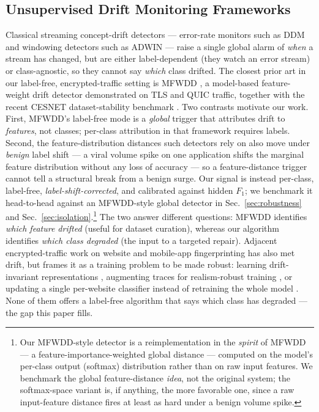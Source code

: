 \subsection{Unsupervised Drift Monitoring Frameworks}
Classical streaming concept-drift detectors --- error-rate monitors such as DDM
\cite{gama2004ddm} and windowing detectors such as ADWIN \cite{bifet2007adwin} ---
raise a single global alarm of \emph{when} a stream has changed, but are either
label-dependent (they watch an error stream) or class-agnostic, so they cannot say
\emph{which} class drifted. The closest prior art in our label-free, encrypted-traffic
setting is MFWDD \cite{mfwdd2024}, a model-based feature-weight
drift detector demonstrated on TLS and QUIC traffic, together with the recent
CESNET dataset-stability benchmark \cite{cesnetdrift2025}. Two contrasts
motivate our work. First, MFWDD's label-free mode is a \emph{global} trigger
that attributes drift to \emph{features}, not classes; per-class attribution in
that framework requires labels. Second, the feature-distribution distances such
detectors rely on also move under \emph{benign} label shift --- a viral volume
spike on one application shifts the marginal feature distribution without any
loss of accuracy --- so a feature-distance trigger cannot tell a structural break
from a benign surge. Our signal is instead per-class, label-free,
\emph{label-shift-corrected}, and calibrated against hidden $F_1$; we benchmark
it head-to-head against an MFWDD-style global detector in
Sec.~\ref{sec:robustness} and Sec.~\ref{sec:isolation}.\footnote{Our MFWDD-style
detector is a reimplementation in the \emph{spirit} of MFWDD --- a
feature-importance-weighted global distance --- computed on the model's per-class
output (softmax) distribution rather than on raw input features. We benchmark the
global feature-distance \emph{idea}, not the original system; the softmax-space
variant is, if anything, the more favorable one, since a raw input-feature
distance fires at least as hard under a benign volume spike.} The two answer different
questions: MFWDD identifies \emph{which feature drifted} (useful for dataset
curation), whereas our algorithm identifies \emph{which class degraded} (the input
to a targeted repair). Adjacent encrypted-traffic work on website and mobile-app
fingerprinting has also met drift, but frames it as a training problem to be made
robust: learning drift-invariant representations \cite{jiang2022fgnet},
augmenting traces for realism-robust training \cite{bahramali2023netclr}, or
updating a single per-website classifier instead of retraining the whole model
\cite{deng2023ares}. None of them offers a label-free algorithm that says which
class has degraded --- the gap this paper fills.

